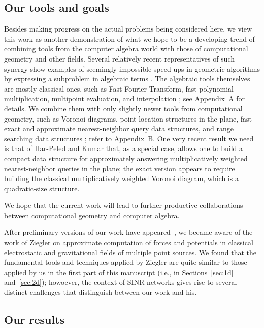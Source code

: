 \documentclass[11pt]{article}
\theoremstyle{remark}
\begin{document}
\subsection{Our tools and goals}
\label{sec:tools}

Besides making progress on the actual problems being considered here, we view this work as another demonstration of what we hope to be a developing trend of combining tools from the computer algebra world with those of computational geometry and other fields.  Several relatively recent representatives of such synergy show examples of seemingly impossible speed-ups in geometric algorithms by expressing a subproblem in algebraic terms \cite{ma-cdplbf-16,ma-cdplbf-12,arst-ccvarp-07}.  The algebraic tools themselves are mostly classical ones, such as Fast Fourier Transform, fast polynomial multiplication, multipoint evaluation, and interpolation \cite{gg-mca-99,bp-pmcfa-94}; see Appendix~A for details. We combine them with only slightly newer tools from computational geometry, such as Voronoi diagrams, point-location structures in the plane, fast exact and approximate nearest-neighbor query data structures, and range searching data structures \cite{bcko-cgaa-08}; refer to Appendix~B.  One very recent result we need is that of Har-Peled and Kumar \cite{wann} that, as a special case, allows one to build a compact data structure for approximately answering multiplicatively weighted nearest-neighbor queries in the plane; the exact version appears to require building the classical multiplicatively weighted Voronoi diagram, which is a quadratic-size structure.

We hope that the current work will lead to further productive collaborations between computational geometry and computer algebra.

After preliminary versions of our work have appeared~\cite{ak-bpsdat-15,this-arXiv}, we became aware of the work of Ziegler \cite{Ziegler03} on approximate computation of forces and potentials in classical electrostatic and gravitational fields of multiple point sources. We found that the fundamental tools and techniques applied by Ziegler are quite similar to those applied by us in the first part of this manuscript (i.e., in Sections~\ref{sec:1d} and~\ref{sec:2d}); howoever, the context of SINR networks gives rise to several distinct challenges that distinguish between our work and his.







\subsection{Our results}
\label{sec:results}
\end{document}
